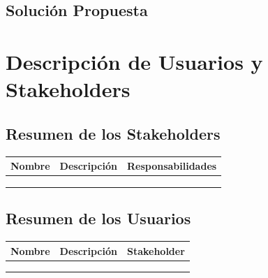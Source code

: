 \documentclass[11pt]{article}
\begin{document}
\subsection{Solución Propuesta}

\newpage
\section{Descripción de Usuarios y Stakeholders}

\subsection{Resumen de los Stakeholders}

\begin{table}[H]
	\centering
	\begin{tabular*}{0.75\textwidth}{c c c}
		\textbf{Nombre} & \textbf{Descripción} & \textbf{Responsabilidades} \\ \hline
		&  &  \\ \hline
		&  &  \\ \hline
		&  &  \\ \hline
	\end{tabular*}
\end{table}

\subsection{Resumen de los Usuarios}

\begin{table}[H]
	\centering
	\begin{tabular*}{0.75\textwidth}{c c c}
		\textbf{Nombre} & \textbf{Descripción} & \textbf{Stakeholder} \\ \hline
		&  &  \\ \hline
		&  &  \\ \hline
		&  &  \\ \hline
	\end{tabular*}
\end{table}
\end{document}

